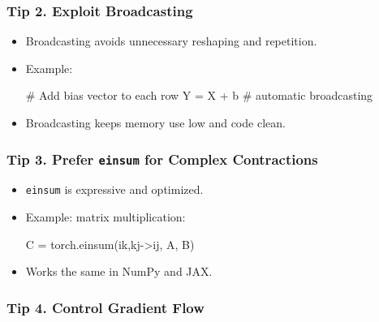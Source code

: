 \documentclass[
  letterpaper,
  DIV=11,
  numbers=noendperiod]{scrreprt}
\newenvironment{Shaded}{\begin{snugshade}}{\end{snugshade}}
\newcommand{\CommentTok}[1]{\textcolor[rgb]{0.37,0.37,0.37}{#1}}
\newcommand{\NormalTok}[1]{\textcolor[rgb]{0.00,0.23,0.31}{#1}}
\newcommand{\OperatorTok}[1]{\textcolor[rgb]{0.37,0.37,0.37}{#1}}
\newcommand{\StringTok}[1]{\textcolor[rgb]{0.13,0.47,0.30}{#1}}
\begin{document}
\subsubsection{Tip 2. Exploit
Broadcasting}\label{tip-2.-exploit-broadcasting}

\begin{itemize}
\item
  Broadcasting avoids unnecessary reshaping and repetition.
\item
  Example:

\begin{Shaded}
\begin{Highlighting}[]
\CommentTok{\# Add bias vector to each row}
\NormalTok{Y }\OperatorTok{=}\NormalTok{ X }\OperatorTok{+}\NormalTok{ b   }\CommentTok{\# automatic broadcasting}
\end{Highlighting}
\end{Shaded}
\item
  Broadcasting keeps memory use low and code clean.
\end{itemize}

\subsubsection{\texorpdfstring{Tip 3. Prefer \texttt{einsum} for Complex
Contractions}{Tip 3. Prefer einsum for Complex Contractions}}\label{tip-3.-prefer-einsum-for-complex-contractions}

\begin{itemize}
\item
  \texttt{einsum} is expressive and optimized.
\item
  Example: matrix multiplication:

\begin{Shaded}
\begin{Highlighting}[]
\NormalTok{C }\OperatorTok{=}\NormalTok{ torch.einsum(}\StringTok{\textquotesingle{}ik,kj{-}\textgreater{}ij\textquotesingle{}}\NormalTok{, A, B)}
\end{Highlighting}
\end{Shaded}
\item
  Works the same in NumPy and JAX.
\end{itemize}

\subsubsection{Tip 4. Control Gradient
Flow}\label{tip-4.-control-gradient-flow}
\end{document}
